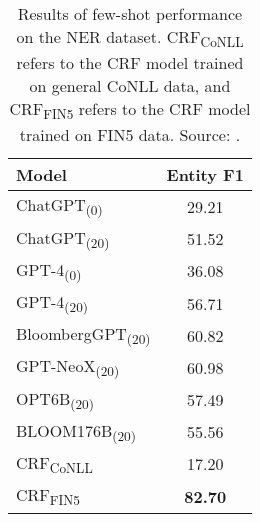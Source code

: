 \begin{table}[!h]
	\centering
	\begin{tabularx}{0.8\textwidth}{Xc}
		\toprule
		\textbf{Model}                   & \textbf{Entity F1} \\
		\midrule
		ChatGPT\textsubscript{(0)}       & 29.21              \\
		ChatGPT\textsubscript{(20)}      & 51.52              \\
		GPT-4\textsubscript{(0)}         & 36.08              \\
		GPT-4\textsubscript{(20)}        & 56.71              \\
		BloombergGPT\textsubscript{(20)} & 60.82              \\
		GPT-NeoX\textsubscript{(20)}     & 60.98              \\
		OPT6B\textsubscript{(20)}        & 57.49              \\
		BLOOM176B\textsubscript{(20)}    & 55.56              \\
		CRF\textsubscript{CoNLL}         & 17.20              \\
		CRF\textsubscript{FIN5}          & \textbf{82.70}     \\
		\bottomrule
	\end{tabularx}
	\caption{Results of few-shot performance on the NER dataset. CRF\textsubscript{CoNLL} refers to the CRF model trained on general CoNLL data, and CRF\textsubscript{FIN5} refers to the CRF model trained on FIN5 data. Source: \protect\textcite{li2023chatgpt}.}
	\label{tab:ner_few_shot_performance}
\end{table}

